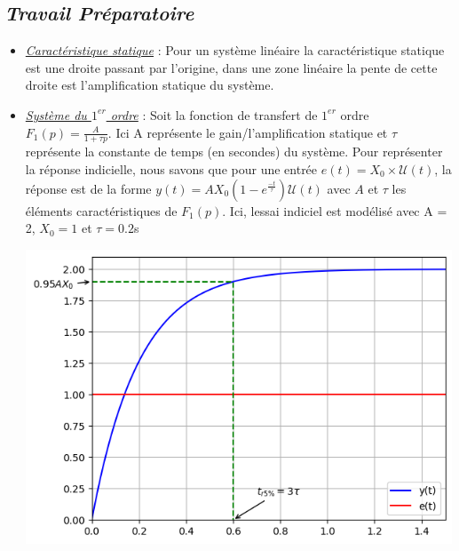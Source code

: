 \documentclass[12pt]{article}
\begin{document}
    \subsection{\itshape Travail Préparatoire}
\begin{itemize}
    

    \item  \underline{\itshape Caractéristique statique} : Pour un système linéaire la caractéristique statique est une
    droite passant par l'origine, dans une zone linéaire la pente de cette droite est
    l'amplification statique du système.

    \item \underline{\itshape Système du $1^{er}$ ordre} : Soit la fonction de transfert de $1^{er}$ ordre $F_1(p) = \frac{A}{1 + \tau p }$. Ici A représente le gain/l'amplification statique et $\tau$ représente la constante de temps (en secondes) du système.
    Pour représenter la réponse indicielle, nous savons que pour une entrée $e(t) = X_0\times\mathcal{U}(t)$, la réponse est de la forme $y(t) = AX_0(1-e^{\frac{-t}{\tau}})\mathcal{U}(t)$ avec $A$ et $\tau$ les éléments caractéristiques de $F_1(p)$.
    Ici, lessai indiciel est modélisé avec A = 2, $X_0 = 1$ et $\tau = 0.2$s
    \begin{center}
        \includegraphics{Reponse_indicielle_prem_ordre.png}
    \end{center}


\end{itemize}
\end{document}

